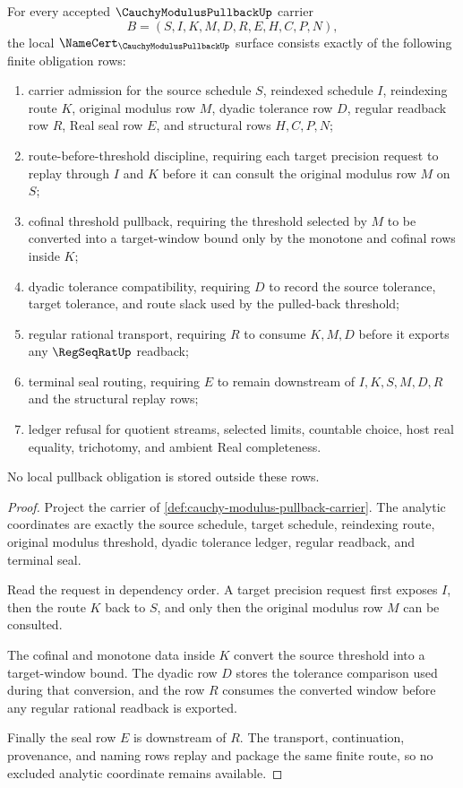 \begin{theorem}
\label{thm:cauchy-modulus-pullback-namecert-obligations}
For every accepted $\CauchyModulusPullbackUp$ carrier
$$
B=(S,I,K,M,D,R,E,H,C,P,N),
$$
the local $\NameCert_{\CauchyModulusPullbackUp}$ surface consists exactly of the following finite obligation rows:
\begin{enumerate}
\item carrier admission for the source schedule $S$, reindexed schedule $I$, reindexing route $K$, original modulus row $M$, dyadic tolerance row $D$, regular readback row $R$, Real seal row $E$, and structural rows $H,C,P,N$;
\item route-before-threshold discipline, requiring each target precision request to replay through $I$ and $K$ before it can consult the original modulus row $M$ on $S$;
\item cofinal threshold pullback, requiring the threshold selected by $M$ to be converted into a target-window bound only by the monotone and cofinal rows inside $K$;
\item dyadic tolerance compatibility, requiring $D$ to record the source tolerance, target tolerance, and route slack used by the pulled-back threshold;
\item regular rational transport, requiring $R$ to consume $K,M,D$ before it exports any $\RegSeqRatUp$ readback;
\item terminal seal routing, requiring $E$ to remain downstream of $I,K,S,M,D,R$ and the structural replay rows;
\item ledger refusal for quotient streams, selected limits, countable choice, host real equality, trichotomy, and ambient Real completeness.
\end{enumerate}
No local pullback obligation is stored outside these rows.
\end{theorem}
\begin{proof}
Project the carrier of \autoref{def:cauchy-modulus-pullback-carrier}. The analytic coordinates are exactly the source schedule, target schedule, reindexing route, original modulus threshold, dyadic tolerance ledger, regular readback, and terminal seal.

Read the request in dependency order. A target precision request first exposes $I$, then the route $K$ back to $S$, and only then the original modulus row $M$ can be consulted.

The cofinal and monotone data inside $K$ convert the source threshold into a target-window bound. The dyadic row $D$ stores the tolerance comparison used during that conversion, and the row $R$ consumes the converted window before any regular rational readback is exported.

Finally the seal row $E$ is downstream of $R$. The transport, continuation, provenance, and naming rows replay and package the same finite route, so no excluded analytic coordinate remains available.
\end{proof}

